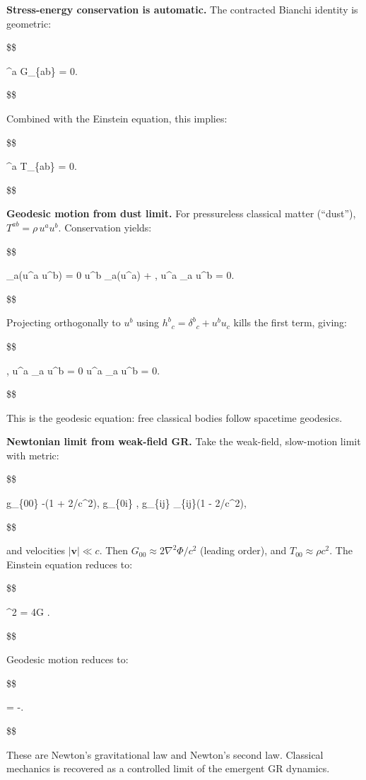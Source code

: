 \documentclass[11pt,a4paper]{article}
\theoremstyle{remark}
\begin{document}
\textbf{Stress-energy conservation is automatic.} The contracted Bianchi identity
is geometric:

\$\$

\nabla\^{}a G\_\{ab\} = 0.

\$\$

Combined with the Einstein equation, this implies:

\$\$

\nabla\^{}a \langle T\_\{ab\} \rangle = 0.

\$\$

\textbf{Geodesic motion from dust limit.} For pressureless classical matter (``dust''),
\(T^{ab} = \rho \, u^a u^b\). Conservation yields:

\$\$

\nabla\_a(\rho u\^{}a u\^{}b) = 0
\quad \Rightarrow \quad
u\^{}b \nabla\_a(\rho u\^{}a) + \rho , u\^{}a \nabla\_a u\^{}b = 0.

\$\$

Projecting orthogonally to \(u^b\) using \(h^b{}_c = \delta^b{}_c + u^b u_c\) kills
the first term, giving:

\$\$

\rho , u\^{}a \nabla\_a u\^{}b = 0
\quad \Rightarrow \quad
u\^{}a \nabla\_a u\^{}b = 0.

\$\$

This is the geodesic equation: free classical bodies follow spacetime geodesics.

\textbf{Newtonian limit from weak-field GR.} Take the weak-field, slow-motion limit
with metric:

\$\$

g\_\{00\} \approx -(1 + 2\Phi/c\^{}2), \qquad
g\_\{0i\} , \qquad
g\_\{ij\} \approx \delta\_\{ij\}(1 - 2\Phi/c\^{}2),

\$\$

and velocities \(|\mathbf{v}| \ll c\). Then \(G_{00} \approx 2\nabla^2\Phi/c^2\)
(leading order), and \(T_{00} \approx \rho c^2\). The Einstein equation reduces to:

\$\$

\nabla\^{}2 \Phi = 4\pi G \rho.

\$\$

Geodesic motion reduces to:

\$\$

 = -\nabla \Phi.

\$\$

These are Newton's gravitational law and Newton's second law. Classical
mechanics is recovered as a controlled limit of the emergent GR dynamics.
\end{document}
